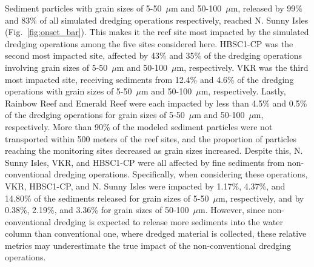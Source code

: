 \documentclass[preprint,12pt,authoryear]{elsarticle}
\begin{document}
Sediment particles with grain sizes of 5-50~$\mu$m and 50-100~$\mu$m, released by 99\% and 83\% of all simulated dredging operations respectively, reached N. Sunny Isles (Fig.~\ref{fig:onset_bar}). This makes it the reef site most impacted by the simulated dredging operations among the five sites considered here. HBSC1-CP was the second most impacted site, affected by 43\% and 35\% of the dredging operations involving grain sizes of 5-50~$\mu$m and 50-100~$\mu$m, respectively. VKR was the third most impacted site, receiving sediments from 12.4\% and 4.6\% of the dredging operations with grain sizes of 5-50~$\mu$m and 50-100~$\mu$m, respectively. Lastly, Rainbow Reef and Emerald Reef were each impacted by less than 4.5\% and 0.5\% of the dredging operations for grain sizes of 5-50~$\mu$m and 50-100~$\mu$m, respectively. More than 90\% of the modeled sediment particles were not transported within 500 meters of the reef sites, and the proportion of particles reaching the monitoring sites decreased as grain sizes increased. Despite this, N. Sunny Isles, VKR, and HBSC1-CP were all affected by fine sediments from non-conventional dredging operations. Specifically, when considering these operations, VKR, HBSC1-CP, and N. Sunny Isles were impacted by 1.17\%, 4.37\%, and 14.80\% of the sediments released for grain sizes of 5-50~$\mu$m, respectively, and by 0.38\%, 2.19\%, and 3.36\% for grain sizes of 50-100~$\mu$m. However, since non-conventional dredging is expected to release more sediments into the water column than conventional one, where dredged material is collected, these relative metrics may underestimate the true impact of the non-conventional dredging operations.
\end{document}
